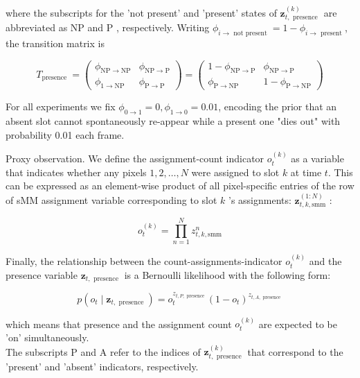\documentclass[10pt]{article}
\begin{document}
where the subscripts for the 'not present' and 'present' states of $\mathbf{z}_{t, \text { presence }}^{(k)}$ are abbreviated as NP and P , respectively. Writing $\phi_{i \rightarrow \text { not present }}=1-\phi_{i \rightarrow \text { present }}$, the transition matrix is

$$
T_{\text {presence }}=\left(\begin{array}{cc}
\phi_{\mathrm{NP} \rightarrow \mathrm{NP}} & \phi_{\mathrm{NP} \rightarrow \mathrm{P}} \\
\phi_{1 \rightarrow \mathrm{NP}} & \phi_{\mathrm{P} \rightarrow \mathrm{P}}
\end{array}\right)=\left(\begin{array}{cc}
1-\phi_{\mathrm{NP} \rightarrow \mathrm{P}} & \phi_{\mathrm{NP} \rightarrow \mathrm{P}} \\
\phi_{\mathrm{P} \rightarrow \mathrm{NP}} & 1-\phi_{\mathrm{P} \rightarrow \mathrm{NP}}
\end{array}\right)
$$

For all experiments we fix $\phi_{0 \rightarrow 1}=0, \phi_{1 \rightarrow 0}=0.01$, encoding the prior that an absent slot cannot spontaneously re-appear while a present one "dies out" with probability 0.01 each frame.

Proxy observation. We define the assignment-count indicator $o_{t}^{(k)}$ as a variable that indicates whether any pixels $1,2, \ldots, N$ were assigned to slot $k$ at time $t$. This can be expressed as an element-wise product of all pixel-specific entries of the row of sMM assignment variable corresponding to slot $k$ 's assignments: $\mathbf{z}_{t, k, \mathrm{smm}}^{(1: N)}$ :

$$
o_{t}^{(k)}=\prod_{n=1}^{N} z_{t, k, \mathrm{smm}}^{n}
$$

Finally, the relationship between the count-assignments-indicator $o_{t}^{(k)}$ and the presence variable $\mathbf{z}_{t, \text { presence }}$ is a Bernoulli likelihood with the following form:


\begin{equation*}
p\left(o_{t} \mid \mathbf{z}_{t, \text { presence }}\right)=o_{t}^{z_{t, P, \text { presence }}}\left(1-o_{t}\right)^{z_{t, A, \text { presence }}} \tag{17}
\end{equation*}


which means that presence and the assignment count $o_{t}^{(k)}$ are expected to be 'on' simultaneously.\\
The subscripts P and A refer to the indices of $\mathbf{z}_{t, \text { presence }}^{(k)}$ that correspond to the 'present' and 'absent' indicators, respectively.
\end{document}
